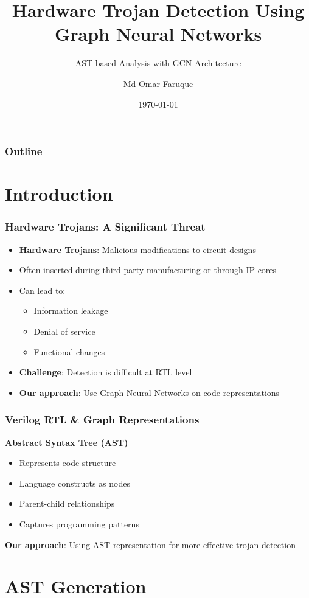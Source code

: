 \documentclass[aspectratio=169]{beamer}
\title{Hardware Trojan Detection Using Graph Neural Networks}
\subtitle{AST-based Analysis with GCN Architecture}
\author{Md Omar Faruque}
\date{\today}
\begin{document}
\begin{frame}
\titlepage
\end{frame}

\begin{frame}
\frametitle{Outline}
\tableofcontents
\end{frame}

\section{Introduction}

\begin{frame}
\frametitle{Hardware Trojans: A Significant Threat}
\begin{itemize}
    \item \textbf{Hardware Trojans}: Malicious modifications to circuit designs
    \item Often inserted during third-party manufacturing or through IP cores
    \item Can lead to:
    \begin{itemize}
        \item Information leakage
        \item Denial of service
        \item Functional changes
    \end{itemize}
    \item \textbf{Challenge}: Detection is difficult at RTL level
    \item \textbf{Our approach}: Use Graph Neural Networks on code representations
\end{itemize}
\end{frame}

\begin{frame}
\frametitle{Verilog RTL \& Graph Representations}

\textbf{Abstract Syntax Tree (AST)}
\begin{itemize}
    \item Represents code structure
    \item Language constructs as nodes
    \item Parent-child relationships
    \item Captures programming patterns
\end{itemize}

\textbf{Our approach}: Using AST representation for more effective trojan detection
\end{frame}

\section{AST Generation}
\end{document}
